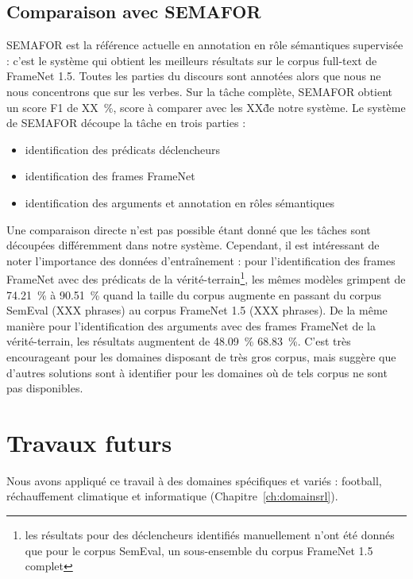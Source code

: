 \subsection{Comparaison avec SEMAFOR}

SEMAFOR \citep{das2014frame} est la référence actuelle en annotation en rôle
sémantiques supervisée : c'est le système qui obtient les meilleurs résultats
sur le corpus full-text de FrameNet 1.5. Toutes les parties du discours sont
annotées alors que nous ne nous concentrons que sur les verbes. Sur la tâche
complète, SEMAFOR obtient un score F1 de XX~\%, score à comparer avec les XX\~
de notre système. Le système de SEMAFOR découpe la tâche en trois parties :

\begin{itemize}
    \item identification des prédicats déclencheurs
    \item identification des frames FrameNet
    \item identification des arguments et annotation en rôles sémantiques 
\end{itemize}

Une comparaison directe n'est pas possible étant donné que les tâches sont
découpées différemment dans notre système. Cependant, il est intéressant de
noter l'importance des données d'entraînement : pour l'identification des
frames FrameNet avec des prédicats de la vérité-terrain\footnote{les résultats
pour des déclencheurs identifiés manuellement n'ont été donnés que pour le
corpus SemEval, un sous-ensemble du corpus FrameNet 1.5 complet}, les mêmes
modèles grimpent de 74.21~\% à 90.51~\% quand la taille du corpus augmente en
passant du corpus SemEval (XXX phrases) au corpus FrameNet 1.5 (XXX phrases).
De la même manière pour l'identification des arguments avec des frames FrameNet
de la vérité-terrain, les résultats augmentent de 48.09~\% 68.83~\%. C'est très
encourageant pour les domaines disposant de très gros corpus, mais suggère que
d'autres solutions sont à identifier pour les domaines où de tels corpus ne
sont pas disponibles.

\section{Travaux futurs}

Nous avons appliqué ce travail à des domaines spécifiques et variés : football,
réchauffement climatique et informatique (Chapitre~\ref{ch:domainsrl}).

